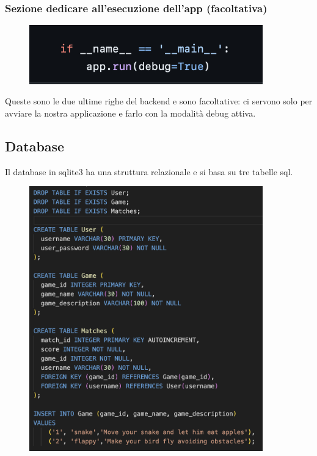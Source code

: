 \documentclass{article}
\begin{document}
\subsubsection{Sezione dedicare all'esecuzione dell'app (facoltativa)}
\begin{figure}[H]
    \centering
    \includegraphics[width=0.9\textwidth]{images/esecuzione_app.png}
\end{figure}

Queste sono le due ultime righe del backend e sono facoltative: ci servono solo per avviare la nostra applicazione e farlo con la modalità debug attiva.



\subsection{Database}
Il database in sqlite3 ha una struttura relazionale e si basa su tre tabelle sql.
\begin{figure}[H]
    \centering
    \includegraphics[width=0.9\textwidth]{images/schema_db.png}
\end{figure}
\end{document}
